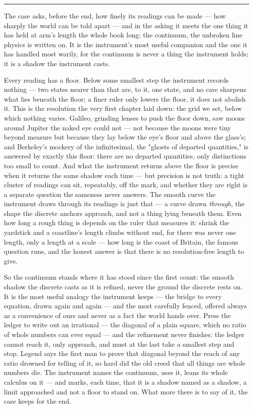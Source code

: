 \bigskip
\begin{center}
\rule{0.4\textwidth}{0.4pt}
\end{center}
\bigskip

\noindent The case asks, before the end, how finely its readings can be made --- how sharply the world can be told
apart --- and in the asking it meets the one thing it has held at arm's length the whole book long: the
continuum, the unbroken line physics is written on. It is the instrument's most useful companion and the one it
has handled most warily, for the continuum is never a thing the instrument holds; it is a shadow the instrument
casts.

Every reading has a floor. Below some smallest step the instrument records nothing --- two states nearer than
that are, to it, one state, and no care sharpens what lies beneath the floor; a finer ruler only lowers the
floor, it does not abolish it. This is the resolution the very first chapter laid down: the grid we set, below
which nothing varies. Galileo, grinding lenses to push the floor down, saw moons around Jupiter the naked eye
could not --- not because the moons were tiny beyond measure but because they lay below the eye's floor and
above the glass's; and Berkeley's mockery of the infinitesimal, the "ghosts of departed quantities," is answered
by exactly this floor: there are no departed quantities, only distinctions too small to count. And what the instrument returns above the floor is precise when it returns the same shadow
each time --- but precision is not truth: a tight cluster of readings can sit, repeatably, off the mark, and
whether they are right is a separate question the sameness never answers. The smooth curve the instrument draws
through its readings is just that --- a curve drawn \emph{through}, the shape the discrete anchors approach, and
not a thing lying beneath them. Even how long a rough thing is depends on the ruler that measures it: shrink the
yardstick and a coastline's length climbs without end, for there was never one length, only a length at a scale
--- how long is the coast of Britain, the famous question runs, and the honest answer is that there is no
resolution-free length to give.

So the continuum stands where it has stood since the first count: the smooth shadow the discrete casts as it is
refined, never the ground the discrete rests on. It is the most useful analogy the instrument keeps --- the
bridge to every equation, drawn again and again --- and the most carefully fenced, offered always as a
convenience of ours and never as a fact the world hands over. Press the ledger to write out an irrational ---
the diagonal of a plain square, which no ratio of whole numbers can ever equal --- and the refinement never
finishes: the ledger cannot reach it, only approach, and must at the last take a smallest step and stop. Legend says the
first man to prove that diagonal beyond the reach of any ratio drowned for telling of it, so hard did the old
creed that all things are whole numbers die. The
instrument names the continuum, uses it, leans its whole calculus on it --- and marks, each time, that it is a
shadow named as a shadow, a limit approached and not a floor to stand on. What more there is to say of it, the
case keeps for the end.


